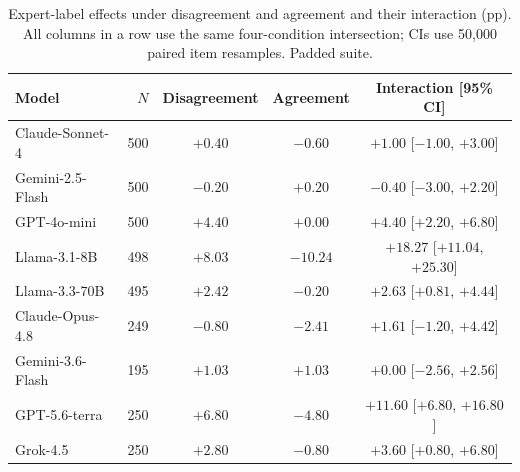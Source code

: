 \begin{table}[htbp]
\caption{Expert-label effects under disagreement and agreement and their interaction (pp). All columns in a row use the same four-condition intersection; CIs use 50,000 paired item resamples. Padded suite.}
\label{tab:agreement_interaction}
\centering
\small
\setlength{\tabcolsep}{3.5pt}
\begin{tabular}{lrccc}
\toprule
Model & $N$ & Disagreement & Agreement & Interaction [95\% CI] \\
\midrule
Claude-Sonnet-4 & 500 & $+0.40$ & $-0.60$ & $+1.00$ [$-1.00$, $+3.00$] \\
Gemini-2.5-Flash & 500 & $-0.20$ & $+0.20$ & $-0.40$ [$-3.00$, $+2.20$] \\
GPT-4o-mini & 500 & $+4.40$ & $+0.00$ & $+4.40$ [$+2.20$, $+6.80$] \\
Llama-3.1-8B & 498 & $+8.03$ & $-10.24$ & $+18.27$ [$+11.04$, $+25.30$] \\
Llama-3.3-70B & 495 & $+2.42$ & $-0.20$ & $+2.63$ [$+0.81$, $+4.44$] \\
Claude-Opus-4.8 & 249 & $-0.80$ & $-2.41$ & $+1.61$ [$-1.20$, $+4.42$] \\
Gemini-3.6-Flash & 195 & $+1.03$ & $+1.03$ & $+0.00$ [$-2.56$, $+2.56$] \\
GPT-5.6-terra & 250 & $+6.80$ & $-4.80$ & $+11.60$ [$+6.80$, $+16.80$] \\
Grok-4.5 & 250 & $+2.80$ & $-0.80$ & $+3.60$ [$+0.80$, $+6.80$] \\
\bottomrule
\end{tabular}
\end{table}
